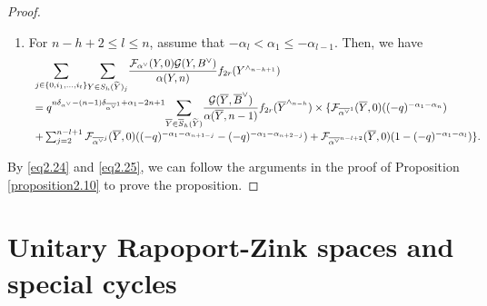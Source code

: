 \documentclass[11pt,oneside]{amsart}
\theoremstyle{plain}
\theoremstyle{definition}
\theoremstyle{remark}
\newcommand{\CF}{{\mathcal F}}
\newcommand{\CG}{{\mathcal G}}
\numberwithin{equation}{section}
\begin{document}
\begin{proof}
\begin{enumerate}
			\item For $n-h+2 \leq l \leq n$, assume that $-\alpha_{l}<\alpha_1 \leq -\alpha_{l-1}$. Then, we have
			\begin{equation*}\begin{array}{l}
					\mathlarger{\sum}_{j \in \lbrace 0,i_1,\dots,i_t \rbrace}\mathlarger{\sum}_{Y \in S_h(\widetilde{Y})_{j}}	\dfrac{\CF_{\alpha^{\vee}}(Y,0)\CG(Y,B^{\vee})}{\alpha(Y,n)}f_{2r}(Y^{\wedge_{n-h+1}})\\
					=q^{n\delta_{\alpha^{\vee}}-(n-1)\delta_{\overline{\alpha^{\vee}}^1}+\alpha_1-2n+1} \mathlarger{\sum}_{\overline{Y} \in \overline{S}_h(\widetilde{Y})}
					\dfrac{\CG(\overline{Y},\overline{B}^{\vee})}{\alpha(\overline{Y},n-1)}f_{2r}(\overline{Y}^{\wedge_{n-h}})
					\times \lbrace \CF_{\overline{\alpha^{\vee}}^{1}}(\overline{Y},0)((-q)^{-\alpha_1-\alpha_{n}})\\
					+\sum_{j=2}^{n-l+1} \CF_{\overline{\alpha^{\vee}}^{j}}(\overline{Y},0)((-q)^{-\alpha_1-\alpha_{n+1-j}}-(-q)^{-\alpha_1-\alpha_{n+2-j}})
					+\CF_{\overline{\alpha^{\vee}}^{n-l+2}}(\overline{Y},0)(1-(-q)^{-\alpha_1-\alpha_{l}}) \rbrace.
				\end{array}
			\end{equation*}	
		\end{enumerate}
		By \eqref{eq2.24} and \eqref{eq2.25}, we can follow the arguments in the proof of Proposition \ref{proposition2.10} to prove the proposition.
	\end{proof}
	
	
	
	
	
	
	
	
	
	
	
	
	
	
	
	
	\section{Unitary Rapoport-Zink spaces and special cycles}
\end{document}
